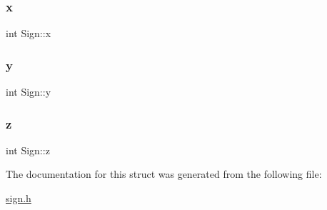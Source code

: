 \mbox{\label{structSign_a9672fe58fa3a1d75c9511fe8259eb4e6}} 
\subsubsection{\texorpdfstring{x}{x}}
{\footnotesize\ttfamily int Sign\+::x}

\mbox{\label{structSign_afdd7a7b76acc62dfd45965caed37c3f3}} 
\subsubsection{\texorpdfstring{y}{y}}
{\footnotesize\ttfamily int Sign\+::y}

\mbox{\label{structSign_a5eb6412ecae2da81951ffdf073a994ed}} 
\subsubsection{\texorpdfstring{z}{z}}
{\footnotesize\ttfamily int Sign\+::z}



The documentation for this struct was generated from the following file\+:\begin{DoxyCompactItemize}
\item 
\hyperlink{sign_8h}{sign.\+h}\end{DoxyCompactItemize}

